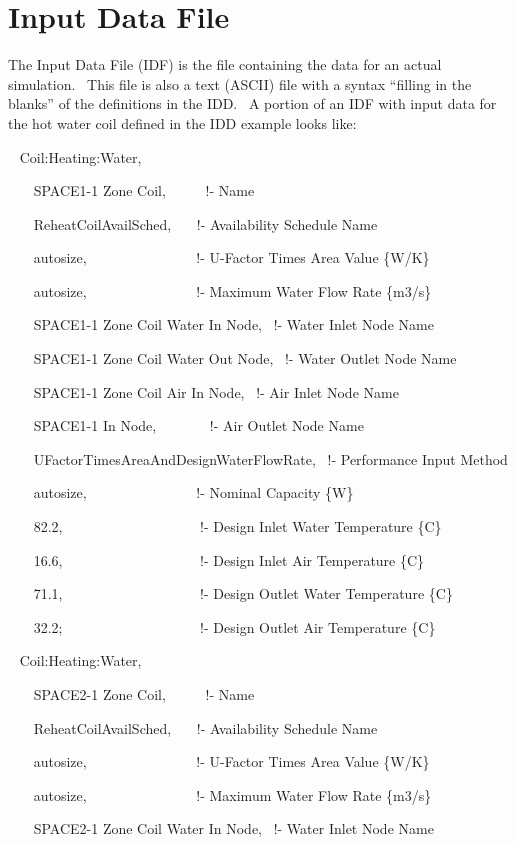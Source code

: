 \section{Input Data File}\label{input-data-file}

The Input Data File (IDF) is the file containing the data for an actual simulation.~ This file is also a text (ASCII) file with a syntax ``filling in the blanks'' of the definitions in the IDD.~ A portion of an IDF with input data for the hot water coil defined in the IDD example looks like:

~ Coil:Heating:Water,

~~~ SPACE1-1 Zone Coil,~~~~~ !- Name

~~~ ReheatCoilAvailSched,~~~ !- Availability Schedule Name

~~~ autosize,~~~~~~~~~~~~~~~ !- U-Factor Times Area Value \{W/K\}

~~~ autosize,~~~~~~~~~~~~~~~ !- Maximum Water Flow Rate \{m3/s\}

~~~ SPACE1-1 Zone Coil Water In Node,~ !- Water Inlet Node Name

~~~ SPACE1-1 Zone Coil Water Out Node,~ !- Water Outlet Node Name

~~~ SPACE1-1 Zone Coil Air In Node,~ !- Air Inlet Node Name

~~~ SPACE1-1 In Node,~~~~~~~ !- Air Outlet Node Name

~~~ UFactorTimesAreaAndDesignWaterFlowRate,~ !- Performance Input Method

~~~ autosize,~~~~~~~~~~~~~~~ !- Nominal Capacity \{W\}

~~~ 82.2,~~~~~~~~~~~~~~~~~~~ !- Design Inlet Water Temperature \{C\}

~~~ 16.6,~~~~~~~~~~~~~~~~~~~ !- Design Inlet Air Temperature \{C\}

~~~ 71.1,~~~~~~~~~~~~~~~~~~~ !- Design Outlet Water Temperature \{C\}

~~~ 32.2;~~~~~~~~~~~~~~~~~~~ !- Design Outlet Air Temperature \{C\}

~ Coil:Heating:Water,

~~~ SPACE2-1 Zone Coil,~~~~~ !- Name

~~~ ReheatCoilAvailSched,~~~ !- Availability Schedule Name

~~~ autosize,~~~~~~~~~~~~~~~ !- U-Factor Times Area Value \{W/K\}

~~~ autosize,~~~~~~~~~~~~~~~ !- Maximum Water Flow Rate \{m3/s\}

~~~ SPACE2-1 Zone Coil Water In Node,~ !- Water Inlet Node Name

